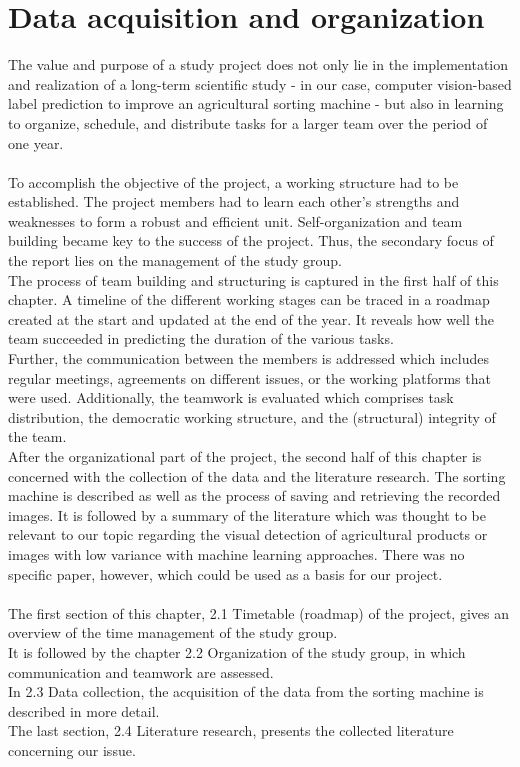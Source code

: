 
\section{Data acquisition and organization}

The value and purpose of a study project does not only lie in the implementation and realization of a long-term scientific study - in our case, computer vision-based label prediction to improve an agricultural sorting machine - but also in learning to organize, schedule, and distribute tasks for a larger team over the period of one year. \\
 \\
To accomplish the objective of the project, a working structure had to be established. The project members had to learn each other's strengths and weaknesses to form a robust and efficient unit. Self-organization and team building became key to the success of the project. Thus, the secondary focus of the report lies on the management of the study group. \\
The process of team building and structuring is captured in the first half of this chapter. A timeline of the different working stages can be traced in a roadmap created at the start and updated at the end of the year. It reveals how well the team succeeded in predicting the duration of the various tasks. \\
Further, the communication between the members is addressed which includes regular meetings, agreements on different issues, or the working platforms that were used. Additionally, the teamwork is evaluated which comprises task distribution, the democratic working structure, and the (structural) integrity of the team. \\
After the organizational part of the project, the second half of this chapter is concerned with the collection of the data and the literature research. The sorting machine is described as well as the process of saving and retrieving the recorded images. It is followed by a summary of the literature which was thought to be relevant to our topic regarding the visual detection of agricultural products or images with low variance with machine learning approaches. There was no specific paper, however, which could be used as a basis for our project. \\
\\
The first section of this chapter, 2.1 Timetable (roadmap) of the project, gives an overview of the time management of the study group. \\
It is followed by the chapter 2.2 Organization of the study group, in which communication and teamwork are assessed. \\
In 2.3 Data collection, the acquisition of the data from the sorting machine is described in more detail. \\
The last section, 2.4 Literature research, presents the collected literature concerning our issue.


